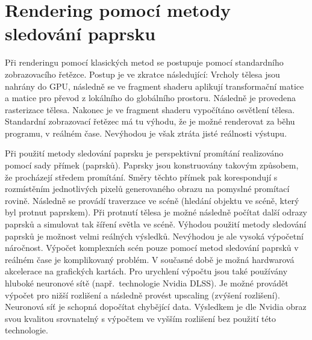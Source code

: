 \documentclass[czech,master]{diploma}
\begin{document}
\section{Rendering pomocí metody sledování paprsku}
Při renderingu pomocí klasických metod se postupuje pomocí standardního zobrazovacího řetězce. Postup je ve zkratce následující: Vrcholy tělesa jsou nahrány do GPU, následně se ve fragment shaderu aplikují transformační matice a matice pro převod z lokálního do globálního prostoru. Následně je provedena rasterizace tělesa. Nakonec je ve fragment shaderu vypočítáno osvětlení tělesa. Standardní zobrazovací řetězec má tu výhodu, že je možné renderovat za běhu programu, v reálném čase. Nevýhodou je však ztráta jisté reálnosti výstupu.\par
Při použití metody sledování paprsku je perspektivní promítání realizováno pomocí sady přímek (paprsků). Paprsky jsou konstruovány takovým způsobem, že procházejí středem promítání. Směry těchto přímek pak korespondují s rozmístěním jednotlivých pixelů generovaného obrazu na pomyslné promítací rovině. Následně se provádí traverzace ve scéně (hledání objektu ve scéně, který byl protnut paprskem). Při protnutí tělesa je možné následně počítat další odrazy paprsků a simulovat tak šíření světla ve scéně. Výhodou použití metody sledování paprsků je možnost velmi reálných výsledků. Nevýhodou je ale vysoká výpočetní náročnost. Výpočet komplexních scén pouze pomocí metod sledování paprsků v reálném čase je komplikovaný problém. V současné době je možná hardwarová akcelerace na grafických kartách. Pro urychlení výpočtu jsou také používány hluboké neuronové sítě (např.\ technologie Nvidia DLSS). Je možné provádět výpočet pro nižší rozlišení a následně provést upscaling (zvýšení rozlišení). Neuronová síť je schopná dopočítat chybějící data. Výsledkem je dle Nvidia obraz svou kvalitou srovnatelný s výpočtem ve vyšším rozlišení bez použití této technologie.
\end{document}
